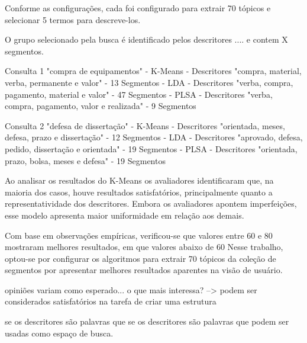 Conforme as configurações, cada foi configurado para extrair 70 tópicos e selecionar 5 termos para descreve-los. 

O grupo selecionado pela busca é identificado pelos descritores .... e contem X segmentos.

Consulta 1 "compra de equipamentos"
	- K-Means 
		- Descritores "compra, material, verba, permanente e valor"
		- 13 Segmentos
	- LDA
		- Descritores "verba, compra, pagamento, material e valor"
		- 47 Segmentos
	- PLSA
		- Descritores "verba, compra, pagamento, valor e realizada"
		- 9 Segmentos

Consulta 2 "defesa de dissertação"
	- K-Means 
		- Descritores "orientada, meses, defesa, prazo e dissertação"
		- 12 Segmentos
	- LDA
		- Descritores "aprovado, defesa, pedido, dissertação e orientada"
		- 19 Segmentos
	- PLSA
		- Descritores "orientada, prazo, bolsa, meses e defesa"
		- 19 Segmentos









Ao analisar os resultados do K-Means os avaliadores identificaram que, na maioria dos casos, houve resultados satisfatórios, principalmente quanto a representatividade dos descritores. Embora os avaliadores apontem imperfeições, esse modelo apresenta maior uniformidade em relação aos demais.


Com base em observações empíricas, verificou-se que valores entre 60 e 80 mostraram melhores resultados, em que valores abaixo de 60 Nesse trabalho, optou-se por configurar os algoritmos para extrair 70 tópicos da coleção de segmentos por apresentar melhores resultados aparentes na visão de usuário.



opiniões variam como esperado...
o que mais interessa?
--> podem ser considerados satisfatórios na tarefa de criar uma estrutura 

se os descritores são palavras que 
se os descritores são palavras que podem ser usadas como espaço de busca.




